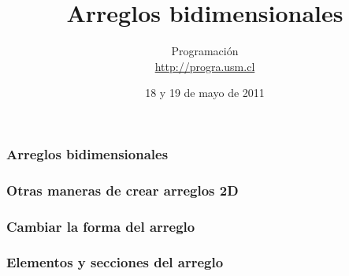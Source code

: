 \documentclass[12pt]{beamer}
\title{Arreglos bidimensionales}
\author{
  Programación \\ \url{http://progra.usm.cl}
}
\date{18 y 19 de mayo de 2011}
\begin{document}
  \begin{frame}
    \maketitle
  \end{frame}

  \begin{frame}
    \label{crear-arreglo-bidmensional}
    \frametitle{Arreglos bidimensionales}
    
  \end{frame}

  \begin{frame}
    \label{crear-arreglo-bidmensional-funciones}
    \frametitle{Otras maneras de crear arreglos 2D}
    
  \end{frame}

  \begin{frame}
    \label{cambiar-forma}
    \frametitle{Cambiar la forma del arreglo}
    
  \end{frame}

  \begin{frame}
    \label{indices}
    \frametitle{Elementos y secciones del arreglo}
    
  \end{frame}
\end{document}
